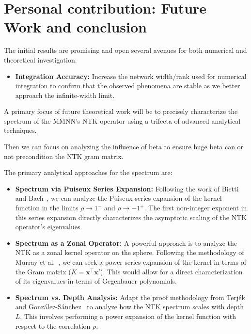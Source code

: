 \documentclass[a4paper]{article}
\theoremstyle{plain}
\theoremstyle{definition}
\theoremstyle{remark}
\begin{document}
\newpage
\section{Personal contribution: Future Work and conclusion}

The initial results are promising and open several avenues for both numerical and theoretical investigation.

\begin{tcolorbox}[colback=red!5,colframe=red!80!black,title={\textbf{Numerical Investigations}},enhanced,drop shadow,boxrule=2pt]
\begin{itemize}
    \item \textbf{Integration Accuracy:} Increase the network width/rank used for numerical integration to confirm that the observed phenomena are stable as we better approach the infinite-width limit.
\end{itemize}
\end{tcolorbox}

\begin{tcolorbox}[colback=red!5,colframe=red!80!black,title={\textbf{Mathematical Investigations: Spectrum Analysis}},enhanced,drop shadow,boxrule=2pt]
A primary focus of future theoretical work will be to precisely characterize the spectrum of the MMNN's NTK operator using a trifecta of advanced analytical techniques.

Then we can focus on analyzing the influence of beta to ensure huge beta can or not precondition the NTK gram matrix.

The primary analytical approaches for the spectrum are:
\begin{itemize}
    \item \textbf{Spectrum via Puiseux Series Expansion:} Following the work of Bietti and Bach~\cite{bietti2021deepequalsshallowrelu}, we can analyze the Puiseux series expansion of the kernel function in the limits $\rho \to 1^-$ and $\rho \to -1^+$. The first non-integer exponent in this series expansion directly characterizes the asymptotic scaling of the NTK operator's eigenvalues.
    \item \textbf{Spectrum as a Zonal Operator:} A powerful approach is to analyze the NTK as a zonal kernel operator on the sphere. Following the methodology of Murray et al.~\cite{murray2023characterizingspectrumntkpower}, we can seek a power series expansion of the kernel in terms of the Gram matrix ($K = \bm{x}^\top\bm{x}'$). This would allow for a direct characterization of its eigenvalues in terms of Gegenbauer polynomials.
    \item \textbf{Spectrum vs. Depth Analysis:} Adapt the proof methodology from Terj\'{e}k and Gonz\'{a}lez-S\'{a}nchez~\cite{terjek2025mlpseocspectrumntk} to analyze how the NTK spectrum scales with depth $L$. This involves performing a power expansion of the kernel function with respect to the correlation $\rho$.
\end{itemize}
\end{tcolorbox}
\end{document}
